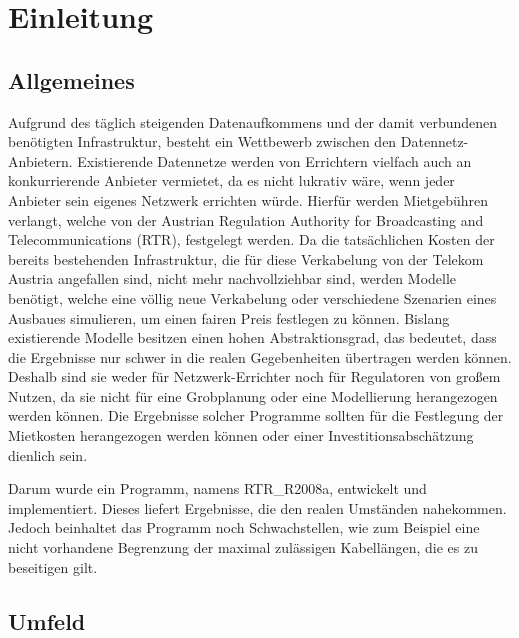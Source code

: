 

\chapter{Einleitung}

\section{Allgemeines}
\label{sec:1einleitung}


\vspace{0.5cm}


\par Aufgrund des täglich steigenden Datenaufkommens und der damit verbundenen benötigten Infrastruktur, besteht ein Wettbewerb zwischen 
den Datennetz-Anbietern. Existierende Datennetze werden von Errichtern vielfach auch an konkurrierende Anbieter vermietet, da es nicht lukrativ wäre, wenn
jeder Anbieter sein eigenes Netzwerk errichten würde. Hierfür werden Mietgebühren verlangt, welche von der Austrian Regulation Authority for Broadcasting 
and Telecommunications (RTR), festgelegt werden. 
Da die tatsächlichen Kosten der bereits bestehenden Infrastruktur, die für diese Verkabelung von der Telekom Austria angefallen sind, nicht mehr nachvollziehbar 
sind, werden Modelle benötigt, welche eine völlig neue Verkabelung oder verschiedene Szenarien eines Ausbaues simulieren, um einen fairen Preis festlegen
zu können.
Bislang existierende Modelle besitzen einen hohen Abstraktionsgrad, das bedeutet, dass die Ergebnisse nur schwer in die realen Gegebenheiten
übertragen werden können. Deshalb sind sie weder für Netzwerk-Errichter noch für Regulatoren von großem Nutzen, da sie nicht für eine 
Grobplanung oder eine Modellierung herangezogen werden können. Die Ergebnisse solcher Programme sollten für die Festlegung der Mietkosten herangezogen
werden können oder einer Investitionsabschätzung dienlich sein.
\par Darum wurde ein Programm, namens RTR\_R2008a, entwickelt und implementiert. Dieses liefert Ergebnisse, die den realen Umständen nahekommen.
Jedoch beinhaltet das Programm noch Schwachstellen, wie zum Beispiel eine nicht vorhandene Begrenzung der maximal zulässigen Kabellängen, die es zu 
beseitigen gilt\cite{pinkafeld1}. 

\section{Umfeld}
\label{sec:1einleitung}


